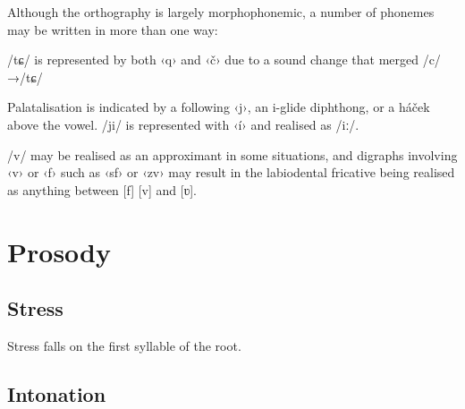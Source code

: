 \documentclass[grammar]{subfiles}
\begin{document}
  Although the orthography is largely morphophonemic, a number of phonemes may be written in more than one way:

  \begin{itemize*}
  \item	/tɕ/ is represented by both ‹q› and ‹č› due to a sound change that merged /c/→/tɕ/
  \item Palatalisation is indicated by a following ‹j›, an i-glide diphthong, or a háček above the vowel. /ji/ is represented with ‹í› and realised as /\superj iː/.
  \item /v/ may be realised as an approximant in some situations, and digraphs involving ‹v› or ‹f› such as ‹sf› or ‹zv› may result in the labiodental fricative being realised as anything between [f] [v] and [ʋ].
  \end{itemize*}

  \section{Prosody}
  \label{sec:prosody}

  \ToBeWritten

  \subsection{Stress}
  \label{ssec:stress}

  Stress falls on the first syllable of the root. \ToBeWritten

  \subsection{Intonation}
  \label{ssec:intonation}

  \ToBeWritten
\end{document}
